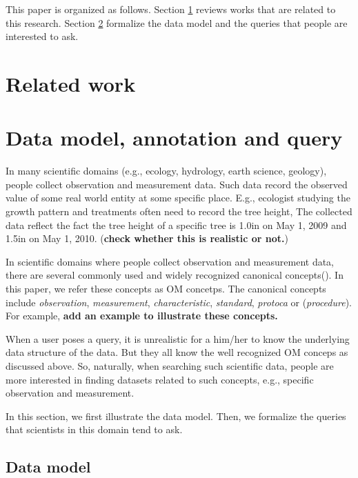 \documentclass[conference]{IEEEtran}
\begin{document}
This paper is organized as follows. 
Section \ref{sec:relatedwork} reviews works that are related to this
research. Section \ref{sec:dataquery} formalize the data model and the
queries that people are interested to ask. 

\section{Related work}\label{sec:relatedwork}



\section{Data model, annotation and query}\label{sec:dataquery}

In many scientific domains (e.g., ecology, hydrology, earth science, geology), people collect observation and
measurement data. Such data record the observed value of some real
world entity at some specific place. E.g., ecologist studying the
growth pattern and treatments often need to record the tree height,
The collected data reflect the fact the tree height of a specific tree is 1.0in on
May 1, 2009 and 1.5in on May 1, 2010. ({\bf check whether this is
  realistic or not.})

In scientific domains where people collect observation and measurement data, there are
several commonly used and widely recognized canonical
concepts(\cite{oboe, om}). 
In this paper, we refer these concepts as OM concetps. 
The canonical concepts include {\em observation}, {\em measurement},
{\em characteristic}, {\em standard}, {\em protoca} or ({\em procedure}). 
For example, {\bf add an example to illustrate these concepts. }

When a user poses a query, it is unrealistic for a him/her to know the 
underlying data structure of the data.  
But they all know the well recognized OM conceps as discussed above. 
So, naturally, when searching such scientific data, people are more interested in finding datasets
related to such concepts, e.g., specific observation and measurement. 

In this section, we first illustrate the data model. Then, we
formalize the queries that scientists in this domain tend to ask. 

\subsection{Data model}\label{sec:datamodel}
\end{document}
